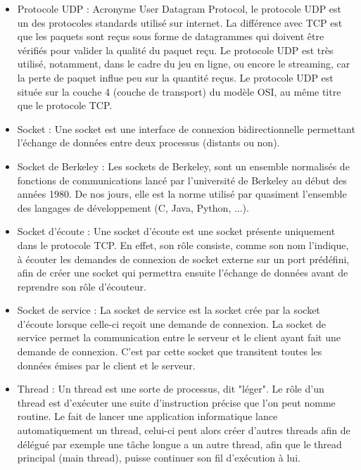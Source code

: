 \begin{appendices}
\begin{itemize}
	\item Protocole UDP :
    Acronyme User Datagram Protocol, le protocole UDP est un des protocoles standards utilisé sur internet. 
    La différence avec TCP est que les paquets sont reçus sous forme de datagrammes qui doivent être vérifiés pour valider la qualité du paquet reçu.
    Le protocole UDP est très utilisé, notamment, dans le cadre du jeu en ligne, ou encore le streaming, car la perte de paquet influe peu sur la quantité reçus.
    Le protocole UDP est située sur la couche 4 (couche de transport) du modèle OSI, au même titre que le protocole TCP. 
   \newline

	\item Socket :
    Une socket est une interface de connexion bidirectionnelle permettant l'échange de données entre deux processus (distants ou non).
	\newline
 
	\item Socket de Berkeley :
    Les sockets de Berkeley, sont un ensemble normalisés de fonctions de communications lancé par l'université de Berkeley au début des années 1980.
    De nos jours, elle est la norme utilisé par quasiment l'ensemble des langages de développement (C, Java, Python, ...).
    \newline
  
	\item Socket d'écoute :
    Une socket d'écoute est une socket présente uniquement dans le protocole TCP. En effet, son rôle consiste, comme son nom l'indique, à écouter les demandes de connexion de socket externe sur un port prédéfini, afin de créer une socket qui permettra ensuite l'échange de données avant de reprendre son rôle d'écouteur.
	\newline
  
	\item Socket de service :
    La socket de service est la socket crée par la socket d'écoute lorsque celle-ci reçoit une demande de connexion. La socket de service permet la communication entre le serveur et le client ayant fait une demande de connexion. C'est par cette socket que transitent toutes les données émises par le client et le serveur.
	\newline
  
	\item Thread :
	Un thread est une sorte de processus, dit "léger". Le rôle d'un thread est d'exécuter une suite d'instruction précise que l'on peut nomme routine.
	Le fait de lancer une application informatique lance automatiquement un thread, celui-ci peut alors créer d'autres threads afin de délégué par exemple une tâche longue a un autre thread, afin que le thread principal (main thread), puisse continuer son fil d'exécution à lui.
	\newline


\end{itemize}
\end{appendices}
